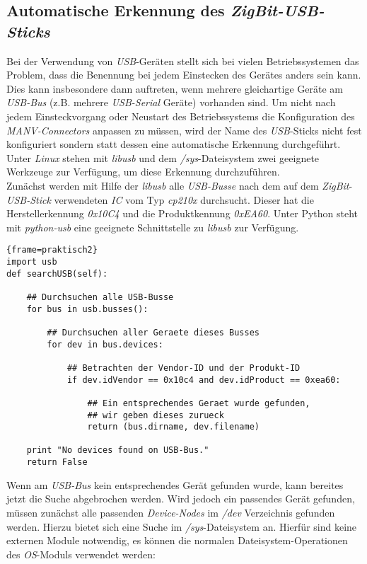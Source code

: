 \subsection{Automatische Erkennung des \emph{ZigBit-USB-Sticks}}\label{usb_stick_erkennen}
Bei der Verwendung von \emph{USB}-Geräten stellt sich bei vielen Betriebssystemen das Problem,
dass die Benennung bei jedem Einstecken des Gerätes anders sein kann. Dies kann insbesondere
dann auftreten, wenn mehrere gleichartige Geräte am \emph{USB-Bus} (z.B. mehrere \emph{USB-Serial}
Geräte) vorhanden sind. Um nicht nach jedem Einsteckvorgang oder Neustart des Betriebssystems die
Konfiguration des \emph{MANV-Connectors} anpassen zu müssen, wird der Name des \emph{USB}-Sticks
nicht fest konfiguriert sondern statt dessen eine automatische Erkennung durchgeführt.
Unter \emph{Linux} stehen mit \emph{libusb} und dem \emph{/sys}-Dateisystem zwei geeignete Werkzeuge
zur Verfügung, um diese Erkennung durchzuführen.\\
Zunächst werden mit Hilfe der \emph{libusb} alle \emph{USB-Busse} nach dem auf dem \emph{ZigBit}-\emph{USB-Stick}
verwendeten \emph{IC} vom Typ \emph{cp210x} durchsucht. Dieser hat die Herstellerkennung \emph{0x10C4} und die
Produktkennung \emph{0xEA60}. Unter Python steht mit \emph{python-usb} eine geeignete Schnittstelle zu
\emph{libusb} zur Verfügung.

\begin{lstlisting}{frame=praktisch2}
import usb
def searchUSB(self):

    ## Durchsuchen alle USB-Busse 
    for bus in usb.busses():

        ## Durchsuchen aller Geraete dieses Busses
        for dev in bus.devices:

            ## Betrachten der Vendor-ID und der Produkt-ID
            if dev.idVendor == 0x10c4 and dev.idProduct == 0xea60:
               
                ## Ein entsprechendes Geraet wurde gefunden,
                ## wir geben dieses zurueck 
                return (bus.dirname, dev.filename)
   
    print "No devices found on USB-Bus."
    return False
\end{lstlisting}

Wenn am \emph{USB-Bus} kein entsprechendes Gerät gefunden wurde, kann bereites jetzt die Suche abgebrochen werden.
Wird jedoch ein passendes Gerät gefunden, müssen zunächst alle passenden \emph{Device-Nodes} im \emph{/dev} 
Verzeichnis gefunden werden. Hierzu bietet sich eine Suche im \emph{/sys}-Dateisystem an. Hierfür sind keine
externen Module notwendig, es können die normalen Dateisystem-Operationen des \emph{OS}-Moduls verwendet werden:

